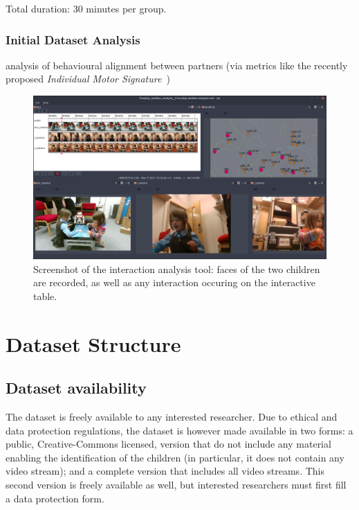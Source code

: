 \documentclass{article}
\begin{document}
Total duration: 30 minutes per group.

\subsubsection{Initial Dataset Analysis}

analysis of behavioural alignment between partners (via
metrics like the recently proposed \emph{Individual Motor
Signature}~\cite{slowinski2016dynamic})

\begin{figure}
    \centering
    \includegraphics[width=\linewidth]{analysis}
    \caption{Screenshot of the interaction analysis tool: faces of the two
    children are recorded, as well as any interaction occuring on the
    interactive table.}
    \label{fig|analysis}
\end{figure}

\section{Dataset Structure}

\subsection{Dataset availability}
\label{availability}


The dataset is freely available to any interested researcher. Due to ethical
and data protection regulations, the dataset is however made available in two
forms: a public, Creative-Commons licensed, version that do not include any
material enabling the identification of the children (in particular, it does not
contain any video stream); and a complete version that includes all video
streams. This second version is freely available as well, but interested
researchers must first fill a data protection form.
\end{document}
